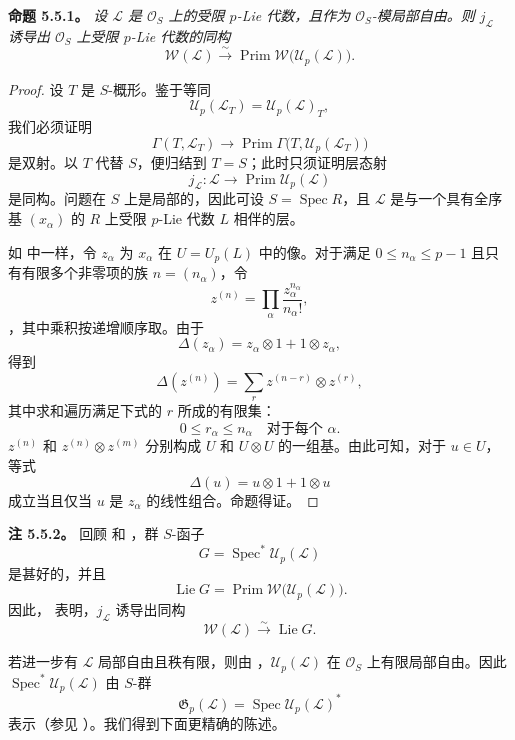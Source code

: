 \medskip
\noindent\textbf{命题 5.5.1。}
\label{sga3:VIIA:5.5.1}
\textit{设 \(\mathcal L\) 是 \(\mathcal O_S\) 上的受限 \(p\)-Lie 代数，且作为 \(\mathcal O_S\)-模局部自由。则 \(j_{\mathcal L}\) 诱导出 \(\mathcal O_S\) 上受限 \(p\)-Lie 代数的同构}
\[
  \mathcal W(\mathcal L)
  \xrightarrow{\sim}
  \operatorname{Prim}
    \mathcal W\bigl(\mathcal U_p(\mathcal L)\bigr).
\]

\begin{proof}
设 \(T\) 是 \(S\)-概形。鉴于等同
\[
  \mathcal U_p(\mathcal L_T)
  =
  \mathcal U_p(\mathcal L)_T,
\]
我们必须证明
\[
  \Gamma(T,\mathcal L_T)
  \longrightarrow
  \operatorname{Prim}
    \Gamma\bigl(T,\mathcal U_p(\mathcal L_T)\bigr)
\]
是双射。以 \(T\) 代替 \(S\)，便归结到 \(T=S\)；此时只须证明层态射
\[
  j_{\mathcal L}:
  \mathcal L
  \longrightarrow
  \operatorname{Prim}\mathcal U_p(\mathcal L)
\]
是同构。问题在 \(S\) 上是局部的，因此可设 \(S=\operatorname{Spec}R\)，且 \(\mathcal L\) 是与一个具有全序基 \((x_\alpha)\) 的 \(R\) 上受限 \(p\)-Lie 代数 \(L\) 相伴的层。

如  中一样，令 \(z_\alpha\) 为 \(x_\alpha\) 在 \(U=U_p(L)\) 中的像。对于满足 \(0\leq n_\alpha\leq p-1\) 且只有有限多个非零项的族 \(n=(n_\alpha)\)，令
\[
  z^{(n)}
  =
  \prod_\alpha\frac{z_\alpha^{n_\alpha}}{n_\alpha!},
\]
，其中乘积按递增顺序取。由于
\[
  \Delta(z_\alpha)
  =
  z_\alpha\otimes1+1\otimes z_\alpha,
\]
得到
\[
  \Delta(z^{(n)})
  =
  \sum_r z^{(n-r)}\otimes z^{(r)},
\]
其中求和遍历满足下式的 \(r\) 所成的有限集：
\[
  0\leq r_\alpha\leq n_\alpha
  \quad\text{对于每个 }\alpha.
\]
\(z^{(n)}\) 和 \(z^{(n)}\otimes z^{(m)}\) 分别构成 \(U\) 和 \(U\otimes U\) 的一组基。由此可知，对于 \(u\in U\)，等式
\[
  \Delta(u)=u\otimes1+1\otimes u
\]
成立当且仅当 \(u\) 是 \(z_\alpha\) 的线性组合。命题得证。
\end{proof}

\medskip
\noindent\textbf{注 5.5.2。}
\label{sga3:VIIA:5.5.2}
回顾  和 ，群 \(S\)-函子
\[
  G=\operatorname{Spec}^{*}\mathcal U_p(\mathcal L)
\]
是甚好的，并且
\[
  \operatorname{Lie}G
  =
  \operatorname{Prim}
    \mathcal W\bigl(\mathcal U_p(\mathcal L)\bigr).
\]
因此， 表明，\(j_{\mathcal L}\) 诱导出同构
\[
  \mathcal W(\mathcal L)
  \xrightarrow{\sim}
  \operatorname{Lie}G.
\]

若进一步有 \(\mathcal L\) 局部自由且秩有限，则由 ，\(\mathcal U_p(\mathcal L)\) 在 \(\mathcal O_S\) 上有限局部自由。因此 \(\operatorname{Spec}^{*}\mathcal U_p(\mathcal L)\) 由 \(S\)-群
\[
  \mathfrak G_p(\mathcal L)
  =
  \operatorname{Spec}\mathcal U_p(\mathcal L)^{*}
\]
表示（参见 ）。我们得到下面更精确的陈述。

